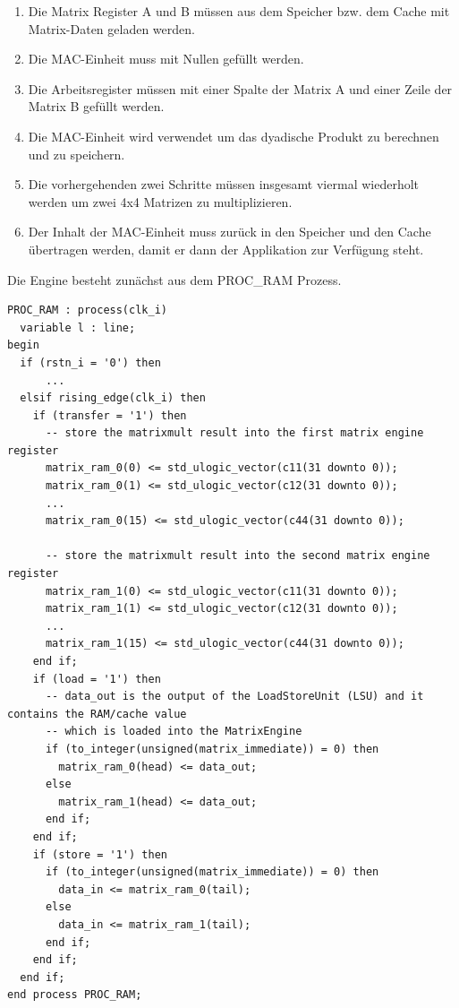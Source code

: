 \begin{enumerate}

    \item Die Matrix Register A und B müssen aus dem Speicher bzw. dem Cache mit Matrix-Daten geladen werden.

    \item Die MAC-Einheit muss mit Nullen gefüllt werden.

    \item Die Arbeitsregister müssen mit einer Spalte der Matrix A und einer Zeile der Matrix B gefüllt werden.

    \item Die MAC-Einheit wird verwendet um das dyadische Produkt zu berechnen und zu speichern.

    \item Die vorhergehenden zwei Schritte müssen insgesamt viermal wiederholt werden um zwei 4x4 Matrizen zu multiplizieren.

    \item Der Inhalt der MAC-Einheit muss zurück in den Speicher und den Cache übertragen werden, damit er dann der Applikation zur Verfügung steht.

\end{enumerate}

Die Engine besteht zunächst aus dem PROC\_RAM Prozess.

\begin{lstlisting}[style=VHDLStyle,caption={Datentransfer der Matrixengine},captionpos=b]
PROC_RAM : process(clk_i)
  variable l : line;
begin
  if (rstn_i = '0') then
      ...
  elsif rising_edge(clk_i) then
    if (transfer = '1') then
      -- store the matrixmult result into the first matrix engine register
      matrix_ram_0(0) <= std_ulogic_vector(c11(31 downto 0));
      matrix_ram_0(1) <= std_ulogic_vector(c12(31 downto 0));
      ...
      matrix_ram_0(15) <= std_ulogic_vector(c44(31 downto 0));

      -- store the matrixmult result into the second matrix engine register
      matrix_ram_1(0) <= std_ulogic_vector(c11(31 downto 0));
      matrix_ram_1(1) <= std_ulogic_vector(c12(31 downto 0));
      ...
      matrix_ram_1(15) <= std_ulogic_vector(c44(31 downto 0));
    end if;
    if (load = '1') then
      -- data_out is the output of the LoadStoreUnit (LSU) and it contains the RAM/cache value
      -- which is loaded into the MatrixEngine
      if (to_integer(unsigned(matrix_immediate)) = 0) then
        matrix_ram_0(head) <= data_out;
      else
        matrix_ram_1(head) <= data_out;
      end if;
    end if;
    if (store = '1') then
      if (to_integer(unsigned(matrix_immediate)) = 0) then
        data_in <= matrix_ram_0(tail);
      else
        data_in <= matrix_ram_1(tail);
      end if;
    end if;
  end if;
end process PROC_RAM;
\end{lstlisting}

